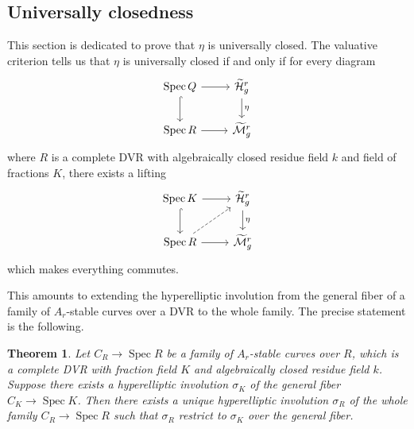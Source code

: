 \documentclass{alggeom}
\numberwithin{equation}{section}
\numberwithin{subsection}{section}
\newtheorem{theorem}{Theorem}[section]
\theoremstyle{definition}
\theoremstyle{remark}
\newcommand\spec{\operatorname{Spec}}
\newcommand{\Mtilde}{\widetilde{\mathcal M}}
\newcommand{\Htilde}{\widetilde{\cH}}
\begin{document}
\subsection*{Universally closedness}

This section is dedicated to prove that $\eta$ is universally closed. The valuative criterion tells us that $\eta$ is universally closed if and only if for every diagram 
$$
\begin{tikzcd}
\spec Q \arrow[r] \arrow[d, hook] & \Htilde_g^r \arrow[d, "\eta"] \\
\spec R \arrow[r]                 & \Mtilde_g^r                  
\end{tikzcd}
$$
where $R$ is a complete DVR with algebraically closed residue field $k$ and field of fractions $K$, there exists a lifting 
$$
\begin{tikzcd}
\spec K \arrow[r] \arrow[d, hook]    & \Htilde_g^r \arrow[d, "\eta"] \\
\spec R \arrow[r] \arrow[ru, dashed] & \Mtilde_g^r                  
\end{tikzcd}
$$
which makes everything commutes. 

This amounts to extending the hyperelliptic involution from the general fiber of a family of $A_r$-stable curves over a DVR to the whole family. The precise statement is the following. 

\begin{theorem}\label{theo:univ-closed}
	Let $C_R\rightarrow \spec R$ be a family of $A_r$-stable curves over $R$, which is a complete DVR with fraction field $K$ and algebraically closed residue field $k$. Suppose there exists a hyperelliptic involution $\sigma_K$ of the general fiber $C_K \rightarrow \spec K$. Then there exists a unique hyperelliptic involution $\sigma_R$ of the whole family $C_R\rightarrow \spec R$ such that $\sigma_R$ restrict to $\sigma_K$ over the general fiber.
\end{theorem} 
\end{document}
